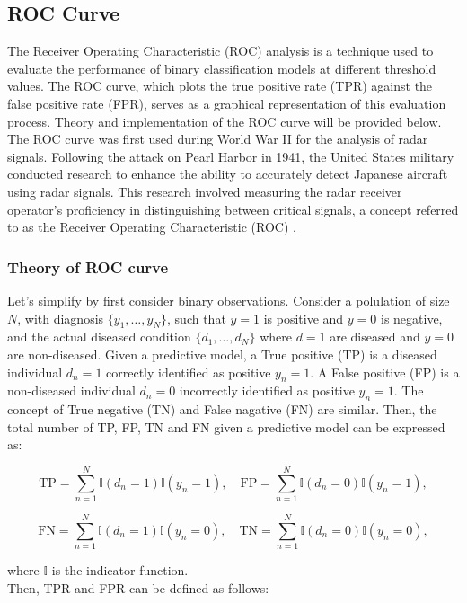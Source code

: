 \documentclass{article}\usepackage[]{graphicx}\usepackage[]{xcolor}
\numberwithin{equation}{section}
\begin{document}
\subsection{ROC Curve}

The Receiver Operating Characteristic (ROC) analysis is a technique used to evaluate the performance of binary classification models at different threshold values. The ROC curve, which plots the true positive rate (TPR) against the false positive rate (FPR), serves as a graphical representation of this evaluation process. Theory and implementation of the ROC curve will be provided below. The ROC curve was first used during World War II for the analysis of radar signals. Following the attack on Pearl Harbor in 1941, the United States military conducted research to enhance the ability to accurately detect Japanese aircraft using radar signals. This research involved measuring the radar receiver operator's proficiency in distinguishing between critical signals, a concept referred to as the Receiver Operating Characteristic (ROC) \cite{rocwiki}.

\subsubsection{Theory of ROC curve}
\noindent
Let's simplify by first consider binary observations. Consider a polulation of size $N$, with diagnosis $\{y_1,\dots,y_N\}$, such that $y = 1$ is positive and $y = 0$ is negative, and the actual diseased condition $\{d_1,\dots,d_N\}$ where $d = 1$ are diseased and $y = 0$ are non-diseased. Given a predictive model, a True positive (TP) is a diseased individual $d_n = 1$ correctly identified as positive $y_n =1$. A False positive (FP) is a non-diseased individual $d_n = 0$ incorrectly identified as positive $y_n =1$. The concept of True negative (TN) and False nagative (FN) are similar. Then, the total number of TP, FP, TN and FN given a predictive model can be expressed as:

\[\text{TP} = \sum^{N}_{n=1} \mathbb{I}(d_n = 1) \mathbb{I}(y_n = 1), \quad \text{FP} = \sum^{N}_{n=1} \mathbb{I}(d_n = 0) \mathbb{I}(y_n = 1),\]

\[\text{FN} = \sum^{N}_{n=1} \mathbb{I}(d_n = 1) \mathbb{I}(y_n = 0), \quad \text{TN} = \sum^{N}_{n=1} \mathbb{I}(d_n = 0) \mathbb{I}(y_n = 0),\]

\noindent
where $\mathbb{I}$ is the indicator function.\\

\noindent
Then, TPR and FPR can be defined as follows:
\end{document}

